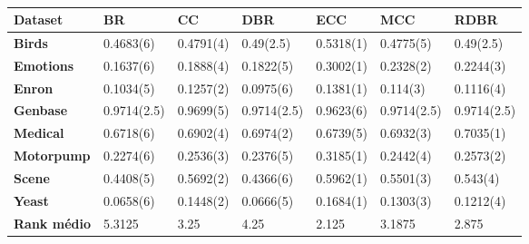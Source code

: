 \begin{table}[h]
\begin{tabular}{lllllll}
\hline
\textbf{Dataset}    & \textbf{BR} & \textbf{CC} & \textbf{DBR} & \textbf{ECC} & \textbf{MCC} & \textbf{RDBR} \\ \hline
\textbf{Birds}      & 0.4683(6)   & 0.4791(4)   & 0.49(2.5)    & 0.5318(1)    & 0.4775(5)    & 0.49(2.5)     \\
\textbf{Emotions}   & 0.1637(6)   & 0.1888(4)   & 0.1822(5)    & 0.3002(1)    & 0.2328(2)    & 0.2244(3)     \\
\textbf{Enron}      & 0.1034(5)   & 0.1257(2)   & 0.0975(6)    & 0.1381(1)    & 0.114(3)     & 0.1116(4)     \\
\textbf{Genbase}    & 0.9714(2.5) & 0.9699(5)   & 0.9714(2.5)  & 0.9623(6)    & 0.9714(2.5)  & 0.9714(2.5)   \\
\textbf{Medical}    & 0.6718(6)   & 0.6902(4)   & 0.6974(2)    & 0.6739(5)    & 0.6932(3)    & 0.7035(1)     \\
\textbf{Motorpump}  & 0.2274(6)   & 0.2536(3)   & 0.2376(5)    & 0.3185(1)    & 0.2442(4)    & 0.2573(2)     \\
\textbf{Scene}      & 0.4408(5)   & 0.5692(2)   & 0.4366(6)    & 0.5962(1)    & 0.5501(3)    & 0.543(4)      \\
\textbf{Yeast}      & 0.0658(6)   & 0.1448(2)   & 0.0666(5)    & 0.1684(1)    & 0.1303(3)    & 0.1212(4)     \\ \hline
\textbf{Rank médio} & 5.3125      & 3.25        & 4.25         & 2.125        & 3.1875       & 2.875         \\ \hline
\end{tabular}
\caption{}
\label{tab:SAj48}
\end{table}